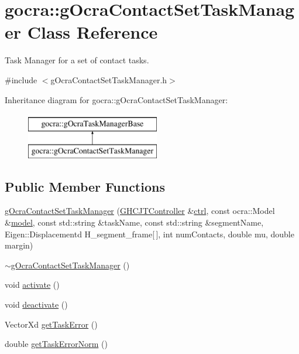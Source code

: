 \hypertarget{classgocra_1_1gOcraContactSetTaskManager}{}\section{gocra\+:\+:g\+Ocra\+Contact\+Set\+Task\+Manager Class Reference}
\label{classgocra_1_1gOcraContactSetTaskManager}


Task Manager for a set of contact tasks.  




{\ttfamily \#include $<$g\+Ocra\+Contact\+Set\+Task\+Manager.\+h$>$}

Inheritance diagram for gocra\+:\+:g\+Ocra\+Contact\+Set\+Task\+Manager\+:\begin{figure}[H]
\begin{center}
\leavevmode
\includegraphics[height=2.000000cm]{d2/d71/classgocra_1_1gOcraContactSetTaskManager}
\end{center}
\end{figure}
\subsection*{Public Member Functions}
\begin{DoxyCompactItemize}
\item 
\hyperlink{classgocra_1_1gOcraContactSetTaskManager_a4ff54810c8e8497f59a62b1a87e2c001}{g\+Ocra\+Contact\+Set\+Task\+Manager} (\hyperlink{classgocra_1_1GHCJTController}{G\+H\+C\+J\+T\+Controller} \&\hyperlink{classgocra_1_1gOcraTaskManagerBase_a52d76d9b54d92f3d31faeaafda99e4c7}{ctrl}, const ocra\+::\+Model \&\hyperlink{classgocra_1_1gOcraTaskManagerBase_adc439e7170f7120611fc6d009d06404e}{model}, const std\+::string \&task\+Name, const std\+::string \&segment\+Name, Eigen\+::\+Displacementd H\+\_\+segment\+\_\+frame\mbox{[}$\,$\mbox{]}, int num\+Contacts, double mu, double margin)
\item 
\hyperlink{classgocra_1_1gOcraContactSetTaskManager_a26033fec662f654121f63ea627a0f5d7}{$\sim$g\+Ocra\+Contact\+Set\+Task\+Manager} ()
\item 
void \hyperlink{classgocra_1_1gOcraContactSetTaskManager_a0fb5ccaae21c77073a6d0f310fe543a4}{activate} ()
\item 
void \hyperlink{classgocra_1_1gOcraContactSetTaskManager_ad9f3b44b46253e5539e658cf3fd8ca37}{deactivate} ()
\item 
Vector\+Xd \hyperlink{classgocra_1_1gOcraContactSetTaskManager_aa0136e8702029873ba4d82c0edc7c571}{get\+Task\+Error} ()
\item 
double \hyperlink{classgocra_1_1gOcraContactSetTaskManager_ac46c258f0b2762bce969b373baad110a}{get\+Task\+Error\+Norm} ()
\end{DoxyCompactItemize}
